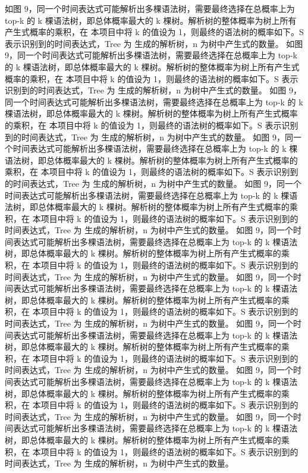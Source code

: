 如图 9，同一个时间表达式可能解析出多棵语法树，需要最终选择在总概率上为 top-k 的
k 棵语法树，即总体概率最大的 k 棵树。解析树的整体概率为树上所有产生式概率的乘积，在
本项目中将 k 的值设为 1，则最终的语法树的概率如下。S 表示识别到的时间表达式，Tree 为
生成的解析树，n 为树中产生式的数量。
如图 9，同一个时间表达式可能解析出多棵语法树，需要最终选择在总概率上为 top-k 的
k 棵语法树，即总体概率最大的 k 棵树。解析树的整体概率为树上所有产生式概率的乘积，在
本项目中将 k 的值设为 1，则最终的语法树的概率如下。S 表示识别到的时间表达式，Tree 为
生成的解析树，n 为树中产生式的数量。
如图 9，同一个时间表达式可能解析出多棵语法树，需要最终选择在总概率上为 top-k 的
k 棵语法树，即总体概率最大的 k 棵树。解析树的整体概率为树上所有产生式概率的乘积，在
本项目中将 k 的值设为 1，则最终的语法树的概率如下。S 表示识别到的时间表达式，Tree 为
生成的解析树，n 为树中产生式的数量。
如图 9，同一个时间表达式可能解析出多棵语法树，需要最终选择在总概率上为 top-k 的
k 棵语法树，即总体概率最大的 k 棵树。解析树的整体概率为树上所有产生式概率的乘积，在
本项目中将 k 的值设为 1，则最终的语法树的概率如下。S 表示识别到的时间表达式，Tree 为
生成的解析树，n 为树中产生式的数量。
如图 9，同一个时间表达式可能解析出多棵语法树，需要最终选择在总概率上为 top-k 的
k 棵语法树，即总体概率最大的 k 棵树。解析树的整体概率为树上所有产生式概率的乘积，在
本项目中将 k 的值设为 1，则最终的语法树的概率如下。S 表示识别到的时间表达式，Tree 为
生成的解析树，n 为树中产生式的数量。
如图 9，同一个时间表达式可能解析出多棵语法树，需要最终选择在总概率上为 top-k 的
k 棵语法树，即总体概率最大的 k 棵树。解析树的整体概率为树上所有产生式概率的乘积，在
本项目中将 k 的值设为 1，则最终的语法树的概率如下。S 表示识别到的时间表达式，Tree 为
生成的解析树，n 为树中产生式的数量。
如图 9，同一个时间表达式可能解析出多棵语法树，需要最终选择在总概率上为 top-k 的
k 棵语法树，即总体概率最大的 k 棵树。解析树的整体概率为树上所有产生式概率的乘积，在
本项目中将 k 的值设为 1，则最终的语法树的概率如下。S 表示识别到的时间表达式，Tree 为
生成的解析树，n 为树中产生式的数量。
如图 9，同一个时间表达式可能解析出多棵语法树，需要最终选择在总概率上为 top-k 的
k 棵语法树，即总体概率最大的 k 棵树。解析树的整体概率为树上所有产生式概率的乘积，在
本项目中将 k 的值设为 1，则最终的语法树的概率如下。S 表示识别到的时间表达式，Tree 为
生成的解析树，n 为树中产生式的数量。
如图 9，同一个时间表达式可能解析出多棵语法树，需要最终选择在总概率上为 top-k 的
k 棵语法树，即总体概率最大的 k 棵树。解析树的整体概率为树上所有产生式概率的乘积，在
本项目中将 k 的值设为 1，则最终的语法树的概率如下。S 表示识别到的时间表达式，Tree 为
生成的解析树，n 为树中产生式的数量。
如图 9，同一个时间表达式可能解析出多棵语法树，需要最终选择在总概率上为 top-k 的
k 棵语法树，即总体概率最大的 k 棵树。解析树的整体概率为树上所有产生式概率的乘积，在
本项目中将 k 的值设为 1，则最终的语法树的概率如下。S 表示识别到的时间表达式，Tree 为
生成的解析树，n 为树中产生式的数量。


